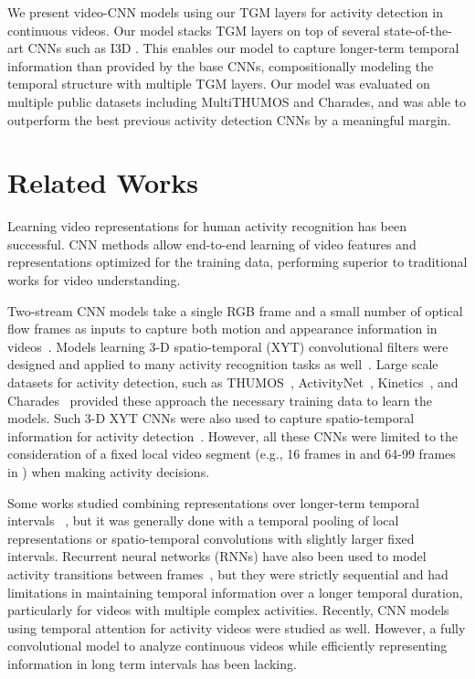 \documentclass{article}
\begin{document}
We present video-CNN models using our TGM layers for activity detection in continuous videos. Our model stacks TGM layers on top of several state-of-the-art CNNs such as I3D \citep{carreira2017quo}. This enables our model to capture longer-term temporal information than provided by the base CNNs, compositionally modeling the temporal structure with multiple TGM layers.
Our model was evaluated on multiple public datasets including MultiTHUMOS and Charades, and was able to outperform the best previous activity detection CNNs by a meaningful margin.


\section{Related Works}

Learning video representations for human activity recognition has been successful. CNN methods allow end-to-end learning of video features and representations optimized for the training data, performing superior to traditional works \citep{aggarwal11} for video understanding.

Two-stream CNN models take a single RGB frame and a small number of optical flow frames as inputs to capture both motion and appearance information in videos~\citep{simonyan2014two,feichtenhofer2016convolutional}. Models learning 3-D spatio-temporal (XYT) convolutional filters were designed and applied to many activity recognition tasks as well~\citep{tran2014c3d,carreira2017quo,tran2017convnet,hara2017learning}. Large scale datasets for activity detection, such as THUMOS~\citep{THUMOS14}, ActivityNet~\citep{caba2015activitynet}, Kinetics~\citep{kay2017kinetics}, and Charades~\citep{sigurdsson2016hollywood} provided these approach the necessary training data to learn the models. Such 3-D XYT CNNs were also used to capture spatio-temporal information for activity detection~\citep{xu2017r,shou2016temporal,shou2017cdc,zhao2017temporal}. However, all these CNNs were limited to the consideration of a fixed local video segment (e.g., 16 frames in \citep{tran2014c3d} and 64-99 frames in \citep{carreira2017quo}) when making activity decisions.






Some works studied combining representations over longer-term temporal intervals ~\citep{karpathy2014large,ng2015beyond,varol17}, but it was generally done with a temporal pooling of local representations or spatio-temporal convolutions with slightly larger fixed intervals. Recurrent neural networks (RNNs) have also been used to model activity transitions between frames~\citep{yeung2015every,yeung2016end,escorcia2016daps}, but they were strictly sequential and had limitations in maintaining temporal information over a longer temporal duration, particularly for videos with multiple complex activities. Recently, CNN models using temporal attention for activity videos \citep{piergiovanni2017learning,piergiovanni2018super} were studied as well. However, a fully convolutional model to analyze continuous videos while efficiently representing information in long term intervals has been lacking.
\end{document}
